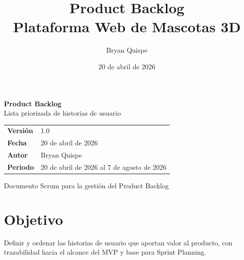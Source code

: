 \documentclass[12pt,a4paper]{article}
\title{\Huge\textbf{Product Backlog}\\[0.3em]\Large Plataforma Web de Mascotas 3D}
\author{Bryan Quispe}
\date{20 de abril de 2026}
\begin{document}
\begin{titlepage}
\centering
\vspace*{1.8cm}
{\Huge\bfseries\color{PrimaryBlue} Product Backlog\\[0.35em]}
{\LARGE Lista priorizada de historias de usuario\\[1.2cm]}

\begin{tabular}{p{5cm} p{8cm}}
\rowcolor{SoftGray}
\textbf{Versión} & 1.0 \\
\textbf{Fecha} & 20 de abril de 2026 \\
\textbf{Autor} & Bryan Quispe \\
\textbf{Periodo} & 20 de abril de 2026 al 7 de agosto de 2026 \\
\end{tabular}

\vfill
{\large Documento Scrum para la gestión del Product Backlog}
\end{titlepage}

\section{Objetivo}
Definir y ordenar las historias de usuario que aportan valor al producto, con trazabilidad hacia el alcance del MVP y base para Sprint Planning.
\end{document}
